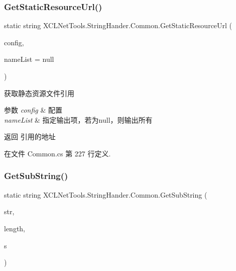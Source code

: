 \subsubsection{\texorpdfstring{Get\+Static\+Resource\+Url()}{GetStaticResourceUrl()}}
{\footnotesize\ttfamily static string X\+C\+L\+Net\+Tools.\+String\+Hander.\+Common.\+Get\+Static\+Resource\+Url (\begin{DoxyParamCaption}\item[{\hyperlink{class_x_c_l_net_tools_1_1_entity_1_1_static_resource_config}{X\+C\+L\+Net\+Tools.\+Entity.\+Static\+Resource\+Config}}]{config,  }\item[{List$<$ string $>$}]{name\+List = {\ttfamily null} }\end{DoxyParamCaption})\hspace{0.3cm}{\ttfamily [static]}}



获取静态资源文件引用 


\begin{DoxyParams}{参数}
{\em config} & 配置\\
\hline
{\em name\+List} & 指定输出项，若为null，则输出所有\\
\hline
\end{DoxyParams}
\begin{DoxyReturn}{返回}
引用的地址
\end{DoxyReturn}


在文件 Common.\+cs 第 227 行定义.

\mbox{\label{class_x_c_l_net_tools_1_1_string_hander_1_1_common_a7e09ea6b3ad85e825e7623017e3e3f6b}} 
\subsubsection{\texorpdfstring{Get\+Sub\+String()}{GetSubString()}}
{\footnotesize\ttfamily static string X\+C\+L\+Net\+Tools.\+String\+Hander.\+Common.\+Get\+Sub\+String (\begin{DoxyParamCaption}\item[{string}]{str,  }\item[{int}]{length,  }\item[{string}]{s }\end{DoxyParamCaption})\hspace{0.3cm}{\ttfamily [static]}}



